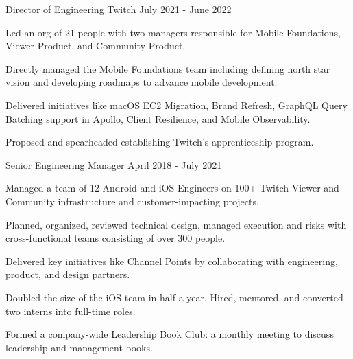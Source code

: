 \begin{cventries}
  \cventry
    {Director of Engineering} %
    {Twitch} %
    {} %
    {July 2021 - June 2022} %
    {
	\begin{cvitems} %
	\item Led an org of 21 people with two managers responsible for Mobile Foundations, Viewer Product, and Community Product.
	\item Directly managed the Mobile Foundations team including defining north star vision and developing roadmaps to advance mobile development.
	\item Delivered initiatives like macOS EC2 Migration, Brand Refresh, GraphQL Query Batching support in Apollo, Client Resilience, and Mobile Observability.
	\item Proposed and spearheaded establishing Twitch’s apprenticeship program.
	\end{cvitems}
    }

  \cventry
    {Senior Engineering Manager} %
    {} %
    {} %
    {April 2018 - July 2021} %
    {
	\begin{cvitems} %
	\item Managed a team of 12 Android and iOS Engineers on 100+ Twitch Viewer and Community infrastructure and customer-impacting projects.
	\item Planned, organized, reviewed technical design, managed execution and risks with cross-functional teams consisting of over 300 people.
	\item Delivered key initiatives like Channel Points by collaborating with engineering, product, and design partners.
	\item Doubled the size of the iOS team in half a year. Hired, mentored, and converted two interns into full-time roles.
	\item Formed a company-wide Leadership Book Club: a monthly meeting to discuss leadership and management books.
	\end{cvitems}
    }


\end{cventries}
